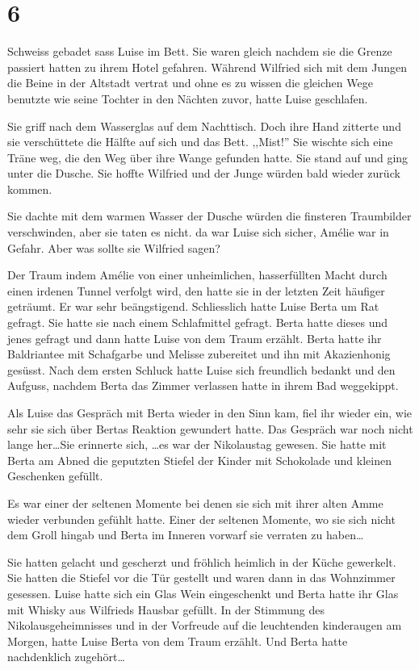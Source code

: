 \documentclass[11pt,titlepage,a5paper]{book}
\newcommand{\am}{Amélie }
\begin{document}
\section*{6}

Schweiss gebadet sass Luise im Bett. Sie waren gleich nachdem sie die Grenze passiert hatten zu ihrem Hotel gefahren. Während Wilfried sich mit dem Jungen die Beine in der Altstadt vertrat und ohne es zu wissen die gleichen Wege benutzte wie seine Tochter in den Nächten zuvor, hatte Luise geschlafen.

Sie griff nach dem Wasserglas auf dem Nachttisch. Doch ihre Hand zitterte und sie verschüttete die Hälfte auf sich und das Bett. ,,Mist!'' Sie wischte sich eine Träne weg, die den Weg über ihre Wange gefunden hatte. Sie stand auf und ging unter die Dusche. Sie hoffte Wilfried und der Junge würden bald wieder zurück kommen.

Sie dachte mit dem warmen Wasser der Dusche würden die finsteren Traumbilder verschwinden, aber sie taten es nicht. da war Luise sich sicher, \am war in Gefahr. Aber was sollte sie Wilfried sagen?

Der Traum indem \am von einer unheimlichen, hasserfüllten Macht durch einen irdenen Tunnel verfolgt wird, den hatte sie in der letzten Zeit häufiger geträumt. Er war sehr beängstigend. Schliesslich hatte Luise Berta um Rat gefragt. Sie hatte sie nach einem Schlafmittel gefragt. Berta hatte dieses und jenes gefragt und dann hatte Luise von dem Traum erzählt. Berta hatte ihr Baldriantee mit Schafgarbe und Melisse  zubereitet und ihn mit Akazienhonig gesüsst. Nach dem ersten Schluck hatte Luise sich freundlich bedankt und den Aufguss, nachdem Berta das Zimmer verlassen hatte in ihrem Bad weggekippt.

Als Luise das Gespräch mit Berta wieder in den Sinn kam, fiel ihr wieder ein, wie sehr sie sich über Bertas Reaktion gewundert hatte. Das Gespräch war noch nicht lange her\dots Sie erinnerte sich, \dots es war der Nikolaustag gewesen. Sie hatte mit Berta am Abned die geputzten Stiefel der Kinder mit Schokolade und kleinen Geschenken gefüllt. 

Es war einer der seltenen Momente bei denen sie sich mit ihrer alten Amme wieder verbunden gefühlt hatte. Einer der seltenen Momente, wo sie sich nicht dem Groll hingab und Berta im Inneren vorwarf sie verraten zu haben\dots

Sie hatten gelacht und gescherzt und fröhlich heimlich in der Küche gewerkelt. Sie hatten die Stiefel vor die Tür gestellt und waren dann in das Wohnzimmer gesessen. Luise hatte sich ein Glas Wein eingeschenkt und Berta hatte ihr Glas mit Whisky aus Wilfrieds Hausbar gefüllt. In der Stimmung des Nikolausgeheimnisses und in der Vorfreude auf die leuchtenden kinderaugen am Morgen, hatte Luise Berta von dem Traum erzählt. Und Berta hatte nachdenklich zugehört\dots 
\end{document}
